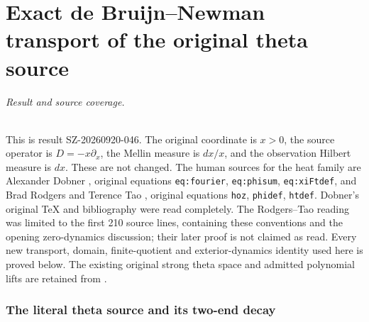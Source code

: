 \endgroup

\clearpage\begingroup
\part*{Exact de Bruijn--Newman transport of the original theta source}
\newcommand{\hdtC}{\mathbb C}\newcommand{\hdtR}{\mathbb R}
\newcommand{\hdtB}{\mathscr B}\newcommand{\hdtEpi}{\mathscr E_\pi}
\newcommand{\hdtMell}{\mathcal M}\newcommand{\hdtSch}{\mathcal S}
\newcommand{\hdtord}{\operatorname{ord}}\newcommand{\hdttr}{\operatorname{tr}}
\newtheorem{hdttheorem}{Theorem}[section]
\newtheorem{hdtlemma}[hdttheorem]{Lemma}
\newtheorem{hdtproposition}[hdttheorem]{Proposition}
\newtheorem{hdtcorollary}[hdttheorem]{Corollary}
\newtheorem{hdtdefinition}[hdttheorem]{Definition}


\paragraph{Result and source coverage.}
This is result SZ-20260920-046. The original coordinate is $x>0$,
the source operator is $D=-x\partial_x$, the Mellin measure is $dx/x$,
and the observation Hilbert measure is $dx$. These are not changed.
The human sources for the heat family are Alexander Dobner
\cite{hdt:Dobner}, original equations \texttt{eq:fourier},
\texttt{eq:phisum}, \texttt{eq:xiFtdef}, and Brad Rodgers and
Terence Tao \cite{hdt:RT}, original equations \texttt{hoz},
\texttt{phidef}, \texttt{htdef}. Dobner's original TeX and bibliography
were read completely. The Rodgers--Tao reading was limited to the
first 210 source lines, containing these conventions and the opening
zero-dynamics discussion; their later proof is not claimed as read.
Every new transport, domain, finite-quotient and exterior-dynamics
identity used here is proved below. The existing original strong
theta space and admitted polynomial lifts are retained from
\cite{hdt:Closed,hdt:Native}.

\section{The literal theta source and its two-end decay}

